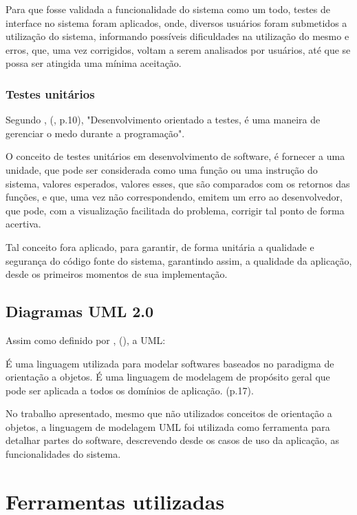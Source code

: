 Para que fosse validada a funcionalidade do sistema como um todo, testes de interface no sistema foram aplicados, onde, diversos usuários foram submetidos a utilização do sistema, informando possíveis dificuldades na utilização do mesmo e erros, que, uma vez corrigidos, voltam a serem analisados por usuários, até que se possa ser atingida uma mínima aceitação.

\subsubsection{Testes unitários}

Segundo , (\citeyear{tdd_by_example}, p.10), "Desenvolvimento orientado a testes, é uma maneira de gerenciar o medo durante a programação".

O conceito de testes unitários em desenvolvimento de software, é fornecer a uma unidade, que pode ser considerada como uma função ou uma instrução do sistema, valores esperados, valores esses, que são comparados com os retornos das funções, e que, uma vez não correspondendo, emitem um erro ao desenvolvedor, que pode, com a visualização facilitada do problema, corrigir tal ponto de forma acertiva.

Tal conceito fora aplicado, para garantir, de forma unitária a qualidade e segurança do código fonte do sistema, garantindo assim, a qualidade da aplicação, desde os primeiros momentos de sua implementação.

\subsection{Diagramas UML 2.0}

Assim como definido por , (\citeyear{uml_pratica}), a UML:

\begin{citacao}
    É uma linguagem utilizada para modelar softwares baseados no paradigma de orientação a objetos. É uma linguagem de modelagem de propósito geral que pode ser aplicada a todos os domínios de aplicação. (p.17).
\end{citacao}

No trabalho apresentado, mesmo que não utilizados conceitos de orientação a objetos, a linguagem de modelagem UML foi utilizada como ferramenta para detalhar partes do software, descrevendo desde os casos de uso da aplicação, as funcionalidades do sistema.

\section{Ferramentas utilizadas}

